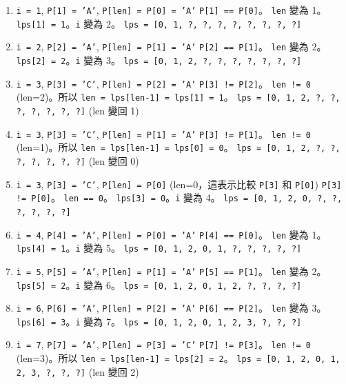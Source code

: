\begin{enumerate}
    \item \texttt{i = 1}, \texttt{P[1] = 'A'}, \texttt{P[len] = P[0] = 'A'}
    \texttt{P[1] == P[0]}。
    \texttt{len} 變為 1。\texttt{lps[1] = 1}。\texttt{i} 變為 2。
    \texttt{lps = [0, 1, ?, ?, ?, ?, ?, ?, ?, ?]}

    \item \texttt{i = 2}, \texttt{P[2] = 'A'}, \texttt{P[len] = P[1] = 'A'}
    \texttt{P[2] == P[1]}。
    \texttt{len} 變為 2。\texttt{lps[2] = 2}。\texttt{i} 變為 3。
    \texttt{lps = [0, 1, 2, ?, ?, ?, ?, ?, ?, ?]}

    \item \texttt{i = 3}, \texttt{P[3] = 'C'}, \texttt{P[len] = P[2] = 'A'}
    \texttt{P[3] != P[2]}。
    \texttt{len != 0} (len=2)。所以 \texttt{len = lps[len-1] = lps[1] = 1}。
    \texttt{lps = [0, 1, 2, ?, ?, ?, ?, ?, ?, ?]} (len 變回 1)

    \item \texttt{i = 3}, \texttt{P[3] = 'C'}, \texttt{P[len] = P[1] = 'A'}
    \texttt{P[3] != P[1]}。
    \texttt{len != 0} (len=1)。所以 \texttt{len = lps[len-1] = lps[0] = 0}。
    \texttt{lps = [0, 1, 2, ?, ?, ?, ?, ?, ?, ?]} (len 變回 0)

    \item \texttt{i = 3}, \texttt{P[3] = 'C'}, \texttt{P[len] = P[0]} (len=0，這表示比較 \texttt{P[3]} 和 \texttt{P[0]})
    \texttt{P[3] != P[0]}。
    \texttt{len == 0}。
    \texttt{lps[3] = 0}。\texttt{i} 變為 4。
    \texttt{lps = [0, 1, 2, 0, ?, ?, ?, ?, ?, ?]}

    \item \texttt{i = 4}, \texttt{P[4] = 'A'}, \texttt{P[len] = P[0] = 'A'}
    \texttt{P[4] == P[0]}。
    \texttt{len} 變為 1。\texttt{lps[4] = 1}。\texttt{i} 變為 5。
    \texttt{lps = [0, 1, 2, 0, 1, ?, ?, ?, ?, ?]}

    \item \texttt{i = 5}, \texttt{P[5] = 'A'}, \texttt{P[len] = P[1] = 'A'}
    \texttt{P[5] == P[1]}。
    \texttt{len} 變為 2。\texttt{lps[5] = 2}。\texttt{i} 變為 6。
    \texttt{lps = [0, 1, 2, 0, 1, 2, ?, ?, ?, ?]}

    \item \texttt{i = 6}, \texttt{P[6] = 'A'}, \texttt{P[len] = P[2] = 'A'}
    \texttt{P[6] == P[2]}。
    \texttt{len} 變為 3。\texttt{lps[6] = 3}。\texttt{i} 變為 7。
    \texttt{lps = [0, 1, 2, 0, 1, 2, 3, ?, ?, ?]}

    \item \texttt{i = 7}, \texttt{P[7] = 'A'}, \texttt{P[len] = P[3] = 'C'}
    \texttt{P[7] != P[3]}。
    \texttt{len != 0} (len=3)。所以 \texttt{len = lps[len-1] = lps[2] = 2}。
    \texttt{lps = [0, 1, 2, 0, 1, 2, 3, ?, ?, ?]} (len 變回 2)


\end{enumerate}
